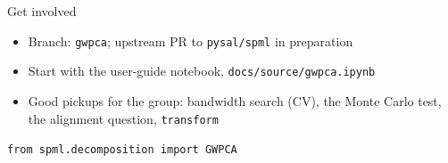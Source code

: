 \documentclass[10pt]{beamer}
\begin{document}
\begin{frame}{Get involved}
  \begin{itemize}
    \item Branch: \texttt{gwpca}; upstream PR to \texttt{pysal/spml} in
      preparation
    \item Start with the user-guide notebook,
      \texttt{docs/source/gwpca.ipynb}
    \item Good pickups for the group: bandwidth search (CV), the Monte Carlo
      test, the alignment question, \texttt{transform}
  \end{itemize}
  \vfill
  \centering
  \Large \texttt{from spml.decomposition import GWPCA}
\end{frame}
\end{document}
